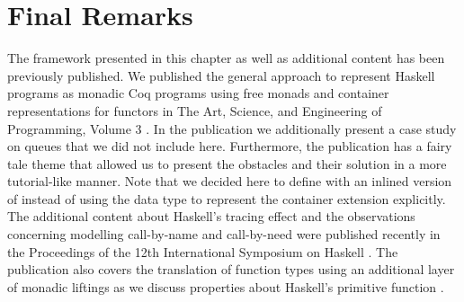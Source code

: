 \section{Final Remarks}

The framework presented in this chapter as well as additional content has been previously published.
We published the general approach to represent Haskell programs as monadic Coq programs using free monads and container representations for functors in The Art, Science, and Engineering of Programming, Volume 3 \citep{dylus2019one}.
In the publication we additionally present a case study on queues that we did not include here.
Furthermore, the publication has a fairy tale theme that allowed us to present the obstacles and their solution in a more tutorial\--like manner.
Note that we decided here to define  with an inlined version of  instead of using the data type to represent the container extension explicitly.
The additional content about Haskell's tracing effect and the observations concerning modelling call\--by\--name and call\--by\--need were published recently in the Proceedings of the 12th International Symposium on Haskell \citep{christiansen2019verifying}.
The publication also covers the translation of function types using an additional layer of monadic liftings as we discuss properties about Haskell's primitive function .
